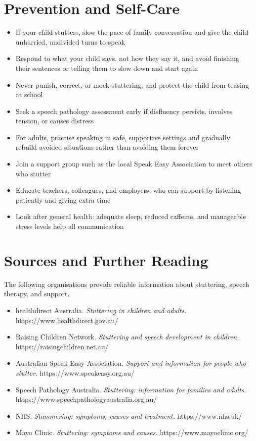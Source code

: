 \section*{Prevention and Self-Care}
\begin{itemize}
    \item If your child stutters, slow the pace of family conversation and give the child unhurried, undivided turns to speak
    \item Respond to what your child says, not how they say it, and avoid finishing their sentences or telling them to slow down and start again
    \item Never punish, correct, or mock stuttering, and protect the child from teasing at school
    \item Seek a speech pathology assessment early if disfluency persists, involves tension, or causes distress
    \item For adults, practise speaking in safe, supportive settings and gradually rebuild avoided situations rather than avoiding them forever
    \item Join a support group such as the local Speak Easy Association to meet others who stutter
    \item Educate teachers, colleagues, and employers, who can support by listening patiently and giving extra time
    \item Look after general health: adequate sleep, reduced caffeine, and manageable stress levels help all communication
\end{itemize}

\section*{Sources and Further Reading}
The following organisations provide reliable information about stuttering, speech therapy, and support.

\begin{itemize}
    \item healthdirect Australia. \textit{Stuttering in children and adults.} https://www.healthdirect.gov.au/
    \item Raising Children Network. \textit{Stuttering and speech development in children.} https://raisingchildren.net.au/
    \item Australian Speak Easy Association. \textit{Support and information for people who stutter.} https://www.speakeasy.org.au/
    \item Speech Pathology Australia. \textit{Stuttering: information for families and adults.} https://www.speechpathologyaustralia.org.au/
    \item NHS. \textit{Stammering: symptoms, causes and treatment.} https://www.nhs.uk/
    \item Mayo Clinic. \textit{Stuttering: symptoms and causes.} https://www.mayoclinic.org/
\end{itemize}

\clearpage
